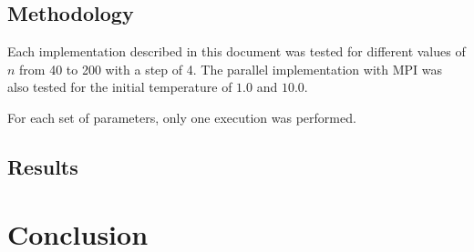\documentclass[abstract=on,9pt,twocolumn]{scrartcl}
\begin{document}
\subsection{Methodology}
Each implementation described in this document was tested for different values of $n$ from 40 to 200 with a step of 4. The parallel implementation with MPI was also tested for the initial temperature of $1.0$ and $10.0$.

For each set of parameters, only one execution was performed.

\subsection{Results}

\section{Conclusion}




\end{document}
